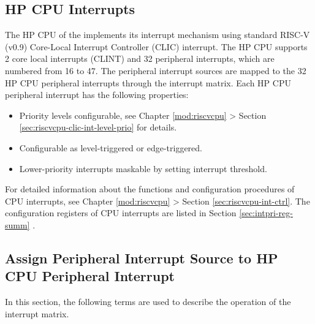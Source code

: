 \documentclass[main\_\_EN.tex]{subfiles}
\begin{document}
\clearpage
{}

\begin{landscape}

\end{landscape}
\restoregeometry
\clearpage

\subsection{HP CPU Interrupts}

The HP CPU of the \chipname{} implements its interrupt mechanism using standard RISC-V (v0.9) Core-Local Interrupt Controller (CLIC) interrupt. The HP CPU supports 2 core local interrupts (CLINT) and 32 peripheral interrupts, which are numbered from 16 to 47. The peripheral interrupt sources are mapped to the 32 HP CPU peripheral interrupts through the interrupt matrix. Each HP CPU peripheral interrupt has the following properties:

\begin{itemize}
    \item Priority levels configurable, see Chapter \ref{mod:riscvcpu} \textit{} > Section \ref{sec:riscvcpu-clic-int-level-prio} \textit{} for details. 
    \item Configurable as level-triggered or edge-triggered.
    \item Lower-priority interrupts maskable by setting interrupt threshold.
\end{itemize}

\begin{tiplisting}
For detailed information about the functions and configuration procedures of CPU interrupts, see Chapter \ref{mod:riscvcpu} \textit{} > Section \ref{sec:riscvcpu-int-ctrl}\textit{}. The configuration registers of CPU interrupts are listed in Section \ref{sec:intpri-reg-summ} \textit{}.
\end{tiplisting}
\vspace{-1em}

\subsection{Assign Peripheral Interrupt Source to HP CPU Peripheral Interrupt}

In this section, the following terms are used to describe the operation of the interrupt matrix.
\end{document}
